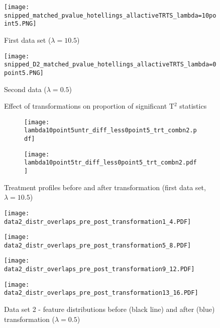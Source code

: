 \documentclass[11pt]{article}
\begin{document}
\clearpage
\begin{figure}[ht!]
\centering
\begin{minipage}{.495\textwidth}
\centering
\texttt{[image: snipped\_matched\_pvalue\_hotellings\_allactiveTRTS\_lambda=10point5.PNG]}
\caption*{First data set ($\lambda= 10.5$)}
\end{minipage}
\begin{minipage}{.495\textwidth}
\centering
\texttt{[image: snipped\_D2\_matched\_pvalue\_hotellings\_allactiveTRTS\_lambda=0point5.PNG]}
\caption*{Second data ($\lambda=0.5$)}
\end{minipage}
\caption{Effect of transformations on proportion of significant T$^2$ statistics}
\label{pvalued1}

\end{figure}
\begin{figure}[ht!]
\begin{subfigure}{.5\textwidth}
  \centering
  \texttt{[image: lambda10point5untr\_diff\_less0point5\_trt\_combn2.pdf]}
  \caption{}
  \label{data1prrofa_supplement}
\end{subfigure}%
\begin{subfigure}{.5\textwidth}
  \centering
  \texttt{[image: lambda10point5tr\_diff\_less0point5\_trt\_combn2.pdf]}
  \caption{}
  \label{data1prrofb_supplement}
\end{subfigure}
\caption{Treatment profiles before and after transformation (first data set, $\lambda = 10.5$)}
\label{data1prrof_supplement}
\end{figure}

\clearpage
\begin{figure}[ht!]
\begin{minipage}{.5\textwidth}
\centering
\texttt{[image: data2\_distr\_overlaps\_pre\_post\_transformation1\_4.PDF]}
\end{minipage}
\begin{minipage}{.5\textwidth}
\centering
\texttt{[image: data2\_distr\_overlaps\_pre\_post\_transformation5\_8.PDF]}
\end{minipage}
\vspace{1mm}
\begin{minipage}{.5\textwidth}
\centering
\texttt{[image: data2\_distr\_overlaps\_pre\_post\_transformation9\_12.PDF]}
\end{minipage}
\begin{minipage}{.5\textwidth}
\centering
\texttt{[image: data2\_distr\_overlaps\_pre\_post\_transformation13\_16.PDF]}
\end{minipage}
\caption{Data set 2 - feature distributions before (black line) and after (blue) transformation ($\lambda = 0.5$)}
\label{distdata2}
\end{figure} 
\end{document}
